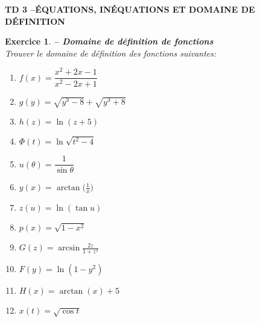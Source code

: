 \documentclass[a4paper,11pt]{article}
\newenvironment{alphate}{\begin{enumerate}[label=\alph*)]}{\end{enumerate}}
\newtheorem{exo}{Exercice}
\newenvironment{exercice}{\begin{exo} \em}{\end{exo}}
\begin{document}



\begin{center}
{\bf TD 3 \quad--\quad \'EQUATIONS, IN\'EQUATIONS ET DOMAINE DE 
D\'EFINITION}
\end{center}
\bigskip 

\addtocounter{exo}{14}


\begin{exercice} {\bf -- Domaine de d\'efinition de fonctions}
\label{TD6-domaine}\\ 
Trouver le domaine de d\'efinition des fonctions suivantes:
\begin{multicols}{3}
\begin{alphate}
\item $f(x)=\dfrac{x^2+2x-1}{x^2-2x+1}$ \smallskip 
\item $g(y)=\sqrt{y^3-8}+\sqrt{y^3+8}$ \smallskip 
\item $h(z)=\ln(z+5)$ \smallskip 
\item $\Phi(t)=\ln\sqrt{t^2-4}$
\item $u(\theta)=\dfrac{1}{\sin\theta}$ \smallskip 
\item $y(x)=\arctan \big(\frac{1}{x}\big)$ \smallskip 
\item $z(u)=\ln(\tan u)$ \smallskip 
\item $p(x)=\sqrt{1-x^2}$
\item $G(z)=\arcsin \frac{2z}{1+z^2}$ \smallskip 
\item $F(y)=\ln(1-y^2)$ \smallskip 
\item $H(x)=\arctan(x)+5$ \smallskip 
\item $x(t)=\sqrt{\cos t}$ 



\end{alphate}
\end{multicols}
\end{exercice}
\bigskip

\end{document}
